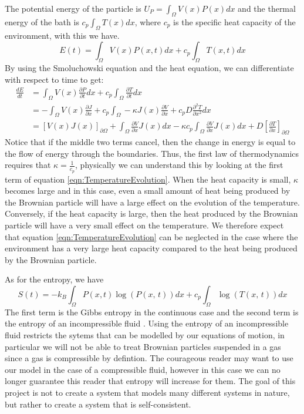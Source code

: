 The potential energy of the particle is $U_P = \int_{\Omega} V(x) P(x) dx$ and the thermal energy of the bath is $c_p \int_{\Omega} T(x) dx$, where $c_p$ is the specific heat capacity of the environment, with this we have.
\begin{equation}
E(t) = \int_{\Omega} V(x)P(x, t) dx + c_p \int_{\Omega} T(x, t) dx
\end{equation}
By using the Smoluchowski equation and the heat equation, we can differentiate with respect to time to get:
\begin{align}
\frac{d E}{d t} & = \int_{\Omega} V(x) \frac{\partial P}{\partial t} dx + c_p \int_{\Omega} \frac{\partial T}{\partial t} dx \\
 & = -\int_{\Omega} V(x) \frac{\partial J}{\partial x} + c_p \int_{\Omega} -\kappa J(x) \frac{\partial V}{\partial x} + c_p D \frac{\partial^2 T}{\partial x^2} dx \\
 & = [V(x)J(x)]_{\partial \Omega}+ \int_{\Omega} \frac{\partial V}{\partial x} J(x) dx - \kappa c_p \int_{\Omega} \frac{\partial V}{\partial x} J(x) dx + D \left [\frac{\partial T}{\partial x} \right]_{\partial \Omega}
\end{align}
Notice that if the middle two terms cancel, then the change in energy is equal to the flow of energy through the boundaries. Thus, the first law of thermodynamics requires that $\kappa = \frac{1}{c_p}$, physically we can understand this by looking at the first term of equation \ref{eqn:TemperatureEvolution}. When the heat capacity is small, $\kappa$ becomes large and in this case, even a small amount of heat being produced by the Brownian particle will have a large effect on the evolution of the temperature. Conversely, if the heat capacity is large, then the heat produced by the Brownian particle will have a very small effect on the temperature. We therefore expect that equation \ref{eqn:TemperatureEvolution} can be neglected in the case where the environment has a very large heat capacity compared to the heat being produced by the Brownian particle.

As for the entropy, we have \cite{Streater1997a}
\begin{equation}
S(t) = -k_B \int_{\Omega} P(x, t) \log(P(x, \, t)) dx + c_p \int_{\Omega} \log(T(x, \, t))dx
\end{equation}
The first term is the Gibbs entropy in the continuous case \cite{Jaynes1965} and the second term is the entropy of an incompressible fluid \cite{CengelBoles1994}. Using the entropy of an incompressible fluid restricts the sytems that can be modelled by our equations of motion, in particular we will not be able to treat Brownian particles suspended in a gas since a gas is compressible by defintion. The courageous reader may want to use our model in the case of a compressible fluid, however in this case we can no longer guarantee this reader that entropy will increase for them. The goal of this project is not to create a system that models many different systems in nature, but rather to create a system that is self-consistent.

